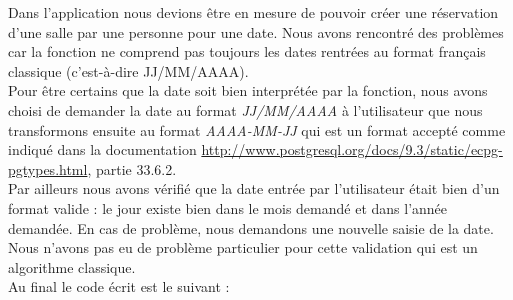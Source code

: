 Dans l'application nous devions être en mesure de pouvoir créer une réservation d'une salle par une personne pour une date. Nous avons rencontré des problèmes car la fonction  ne comprend pas toujours les dates rentrées au format français classique (c'est-à-dire JJ/MM/AAAA).\\

Pour être certains que la date soit bien interprétée par la fonction, nous avons choisi de demander la date au format \textit{JJ/MM/AAAA} à l'utilisateur que nous transformons ensuite au format \textit{AAAA-MM-JJ} qui est un format accepté comme indiqué dans la documentation \url{http://www.postgresql.org/docs/9.3/static/ecpg-pgtypes.html}, partie 33.6.2.\\

Par ailleurs nous avons vérifié que la date entrée par l'utilisateur était bien d'un format valide : le jour existe bien dans le mois demandé et dans l'année demandée. En cas de problème, nous demandons une nouvelle saisie de la date. Nous n'avons pas eu de problème particulier pour cette validation qui est un algorithme classique.\\

Au final le code écrit est le suivant :
\inputminted[tabsize=4,linenos,fontsize=\small]{c}{code/validationDate.c}